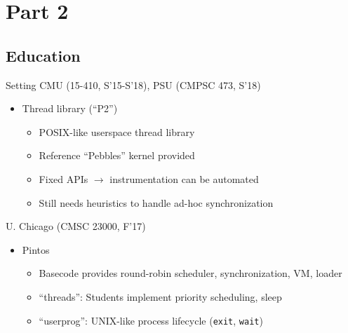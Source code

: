 \documentclass[xcolor=dvipsnames]{beamer}
\begin{document}

\section{Part 2}
\subsection{Education}


\begin{frame}{Setting}
	CMU (15-410, S'15-S'18), PSU (CMPSC 473, S'18)
	\begin{itemize}
		\item Thread library (``P2'')
			\begin{itemize}
				\item POSIX-like userspace thread library %
				\item Reference ``Pebbles'' kernel provided
				\item Fixed APIs $\rightarrow$ instrumentation can be automated
				\item Still needs heuristics to handle ad-hoc synchronization
			\end{itemize}
	\end{itemize}
	\pause
	\linegap

	U. Chicago (CMSC 23000, F'17)
	\begin{itemize}
		\item Pintos %
		\begin{itemize}
			\item Basecode provides round-robin scheduler, synchronization, VM, loader
			\item ``threads'': Students implement priority scheduling, sleep

			\item ``userprog'': UNIX-like process lifecycle
				({\tt exit}, {\tt wait})
		\end{itemize}
	\end{itemize}
\end{frame}
\end{document}
